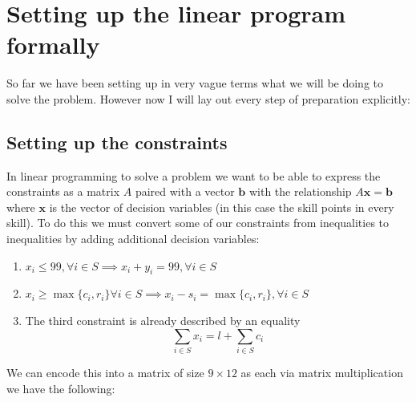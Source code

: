 \documentclass{article}
\begin{document}
\section{Setting up the linear program formally}
\par So far we have been setting up in very vague terms what we will be doing to solve the problem. However now I will lay out every step of preparation explicitly:
\subsection{Setting up the constraints}
\par In linear programming to solve a problem we want to be able to express the constraints as a matrix $A$ paired with a vector $\boldsymbol{b}$ with the relationship $A\boldsymbol{x} = \boldsymbol{b}$ where $\boldsymbol{x}$ is the vector of decision variables (in this case the skill points in every skill). To do this we must convert some of our constraints from inequalities to inequalities by adding additional decision variables:
\begin{enumerate}
    \item $x_i \leq 99, \forall i \in S \implies x_i + y_i = 99, \forall i \in S$
    \item $x_i \geq \max\{c_i, r_i\} \forall i \in S \implies x_i - s_i = \max\{c_i, r_i\}, \forall i \in S$
    \item The third constraint is already described by an equality $$\sum_{i \in S} x_i = l + \sum_{i \in S} c_i$$
\end{enumerate}
\pagebreak
\par We can encode this into a matrix of size $9 \times 12$ as each via matrix multiplication we have the following:
\setcounter{MaxMatrixCols}{12}
\end{document}
